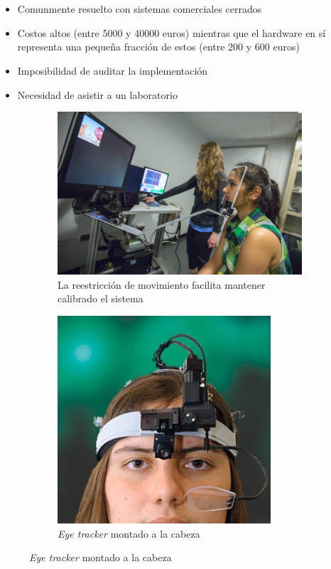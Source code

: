 \documentclass[aspectratio=169]{beamer}
\begin{document}
\begin{frame}{~}
\end{frame}

\begin{frame}{~}

  \begin{itemize}
    \item Comunmente resuelto con sistemas comerciales cerrados
    \item Costos altos (entre 5000 y 40000 euros) mientras que el hardware en
      sí representa una pequeña fracción de estos (entre 200 y 600 euros)

    \item Imposibilidad de auditar la implementación
    \item Necesidad de asistir a un laboratorio
  \end{itemize}

  \begin{figure}
    \begin{subfigure}{0.49\textwidth}
      \centering
      \includegraphics[width=0.6\linewidth]{img/eye-link-chinrest.jpg}
      \caption{La reestricción de movimiento facilita mantener calibrado el
      sistema}
    \end{subfigure}
    \begin{subfigure}{0.49\textwidth}
      \centering
      \includegraphics[width=0.5\linewidth]{img/eye-tracker-head-mounted.jpg}
      \caption{\textit{Eye tracker} montado a la cabeza}
    \end{subfigure}
  \end{figure}

\end{frame}
\end{document}
